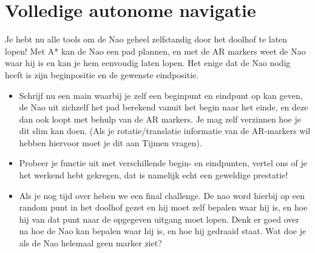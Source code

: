 \documentclass[a4paper]{article}
\begin{document}
\section{Volledige autonome navigatie}

Je hebt nu alle tools om de Nao geheel zelfstandig door het doolhof te laten lopen! Met A* kan de Nao een pad plannen, en met de AR markers weet de Nao waar hij is en kan je hem eenvoudig laten lopen. Het enige dat de Nao nodig heeft is zijn beginpositie en de gewenste eindpositie.

\begin{Exercise}
\begin{itemize}
\item Schrijf nu een main waarbij je zelf een beginpunt en eindpunt op kan geven, de Nao uit zichzelf het pad berekend vanuit het begin naar het einde, en deze dan ook loopt met behulp van de AR markers. Je mag zelf verzinnen hoe je dit slim kan doen. (Als je rotatie/translatie informatie van de AR-markers wil hebben hiervoor moet je dit aan Tijmen vragen).
\item Probeer je functie uit met verschillende begin- en eindpunten, vertel ons of je het werkend hebt gekregen, dat is namelijk echt een geweldige prestatie!
\item Als je nog tijd over heben we een final challenge. De nao word hierbij op een random punt in het doolhof gezet en hij moet zelf bepalen waar hij is, en hoe hij van dat punt naar de opgegeven uitgang moet lopen. Denk er goed over na hoe de Nao kan bepalen waar hij is, en hoe hij gedraaid staat. Wat doe je als de Nao helemaal geen marker ziet?
\end{itemize}
\end{Exercise}
\vspace{10 mm}
\end{document}
